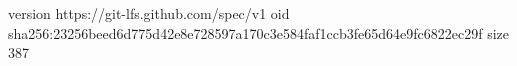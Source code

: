 version https://git-lfs.github.com/spec/v1
oid sha256:23256beed6d775d42e8e728597a170c3e584faf1ccb3fe65d64e9fc6822ec29f
size 387
